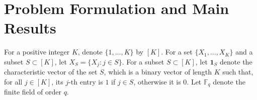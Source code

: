 \documentclass[letterpaper, 10 pt, conference]{ieeeconf}
\newcommand{\GF}[1]{\mathbb{F}_{#1}} %
\begin{document}









\section{Problem Formulation and Main Results}
\label{sec:basics}

For a positive integer $K$, denote $\{1,\dots,K\}$ by $[K]$. %
For a set $\{X_1,\dots,X_K\}$ and a subset $S\subset {[K]}$, let \mbox{$X_S = \{X_j : j\in S\}$}. For a subset $S \subset [K]$, let $\mathbf{1}_S$ denote the characteristic vector of the set $S$, which is a binary vector of length $K$ such that, for all $j\in[K]$, its $j$-th entry is $1$ if $j\in S$, otherwise it is $0$. Let $\GF{q}$ denote the finite field of order 
$q$. %
\end{document}

